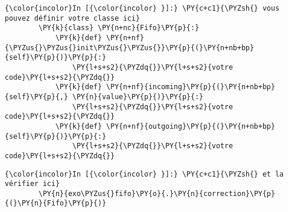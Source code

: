     \begin{Verbatim}[commandchars=\\\{\}]
{\color{incolor}In [{\color{incolor} }]:} \PY{c+c1}{\PYZsh{} vous pouvez définir votre classe ici}
        \PY{k}{class} \PY{n+nc}{Fifo}\PY{p}{:}
            \PY{k}{def} \PY{n+nf}{\PYZus{}\PYZus{}init\PYZus{}\PYZus{}}\PY{p}{(}\PY{n+nb+bp}{self}\PY{p}{)}\PY{p}{:}
                \PY{l+s+s2}{\PYZdq{}}\PY{l+s+s2}{votre code}\PY{l+s+s2}{\PYZdq{}}
            \PY{k}{def} \PY{n+nf}{incoming}\PY{p}{(}\PY{n+nb+bp}{self}\PY{p}{,} \PY{n}{value}\PY{p}{)}\PY{p}{:}
                \PY{l+s+s2}{\PYZdq{}}\PY{l+s+s2}{votre code}\PY{l+s+s2}{\PYZdq{}}
            \PY{k}{def} \PY{n+nf}{outgoing}\PY{p}{(}\PY{n+nb+bp}{self}\PY{p}{)}\PY{p}{:}
                \PY{l+s+s2}{\PYZdq{}}\PY{l+s+s2}{votre code}\PY{l+s+s2}{\PYZdq{}}
\end{Verbatim}


    \begin{Verbatim}[commandchars=\\\{\}]
{\color{incolor}In [{\color{incolor} }]:} \PY{c+c1}{\PYZsh{} et la vérifier ici}
        \PY{n}{exo\PYZus{}fifo}\PY{o}{.}\PY{n}{correction}\PY{p}{(}\PY{n}{Fifo}\PY{p}{)}
\end{Verbatim}